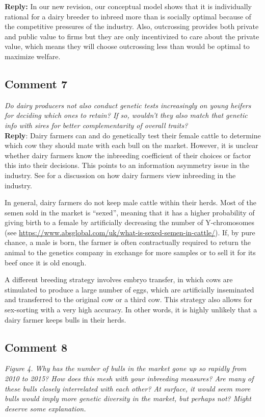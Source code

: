 \documentclass[12pt,letterpaper]{article}
\begin{document}
\textbf{Reply:} In our new revision, our conceptual model shows that it is individually rational for a dairy breeder to inbreed more than is socially optimal because of the competitive pressures of the industry. Also, outcrossing provides both private and public value to firms but they are only incentivized to care about the private value, which means they will choose outcrossing less than would be optimal to maximize welfare.

\subsection*{Comment 7}
{\it Do dairy producers not also conduct genetic tests increasingly on young heifers for deciding which ones to retain? If so, wouldn’t they also match that genetic info with sires for better complementarity of overall traits?} \\

\textbf{Reply}: Dairy farmers can and do genetically test their female cattle to determine which cow they should mate with each bull on the market. However, it is unclear whether dairy farmers know the inbreeding coefficient of their choices or factor this into their decisions. This points to an information asymmetry issue in the industry. See \cite{Cole2023} for a discussion on how dairy farmers view inbreeding in the industry.

In general, dairy farmers do not keep male cattle within their herds. Most of the semen sold in the market is ``sexed'', meaning that it has a higher probability of giving birth to a female by artificially decreasing the number of Y-chromosomes (see \url{https://www.absglobal.com/uk/what-is-sexed-semen-in-cattle/}). If, by pure chance, a male is born, the farmer is often contractually required to return the animal to the genetics company in exchange for more samples or to sell it for its beef once it is old enough. 

A different breeding strategy involves embryo transfer, in which cows are stimulated to produce a large number of eggs, which are artificially inseminated and transferred to the original cow or a third cow. This strategy also allows for sex-sorting with a very high accuracy. In other words, it is highly unlikely that a dairy farmer keeps bulls in their herds.

\subsection*{Comment 8}
{\it Figure 4. Why has the number of bulls in the market gone up so rapidly from 2010 to 2015?  How does this mesh with your inbreeding measures? Are many of these bulls closely interrelated with each other?  At surface, it would seem more bulls would imply more genetic diversity in the market, but perhaps not?  Might deserve some explanation.} \\
\end{document}
